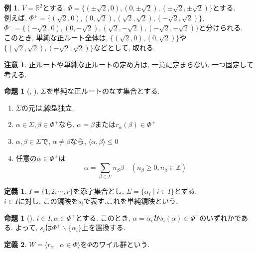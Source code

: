 \documentclass[
  a4paper, 
  12pt,
  ja=standard,
  xelatex,
  left=30truemm,
  right=30truemm,
  titlepage 
]{bxjsarticle}
\theoremstyle{definition}
\newtheorem{df}{定義}
\newtheorem{prop}[thm]{命題}
\newtheorem*{ex}{例}
\newtheorem*{re}{注意}
\begin{document}
\begin{ex}
  $ V = \mathbb{R}^2$とする. $ \Phi = \{ (\pm \sqrt{2}, 0), (0, \pm\sqrt{2}), (\pm\sqrt{2}, \pm\sqrt{2}) \}$とする. \\
  例えば, $\Phi^{+} = \{ ( \sqrt{2}, 0), (0, \sqrt{2}), (\sqrt{2}, \sqrt{2}), (-\sqrt{2}, \sqrt{2}) \}$, \\
  $\Phi^{-} = \{ ( -\sqrt{2}, 0), (0, -\sqrt{2}), (\sqrt{2}, -\sqrt{2}), (-\sqrt{2}, -\sqrt{2}) \}$と分けられる.  \\
  このとき, 単純な正ルート全体は,  $\{ ( \sqrt{2}, 0), (0, \sqrt{2}) \}$や$ \{ (\sqrt{2}, \sqrt{2}), (-\sqrt{2}, \sqrt{2}) \}$などとして,
  取れる.
\end{ex}

\begin{re}
  正ルートや単純な正ルートの定め方は, 一意に定まらない. 一つ固定して考える.
\end{re}

\begin{prop} [{\cite[命題2.1]{b1}}, {\cite[命題20.1]{b2}}] 
  $\Sigma$を単純な正ルートのなす集合とする.
  \begin{enumerate} 
    \item $\Sigma$の元は,線型独立.
    \item $\alpha \in \Sigma, \beta \in \Phi^{+}$なら, $\alpha = \beta$または$r_{\alpha}(\beta) \in \Phi^{+}$
    \item $\alpha, \beta \in \Sigma $で, $\alpha \neq \beta $なら, $ \langle \alpha, \beta \rangle \leq 0 $
    \item 任意の$\alpha \in \Phi^{+}$は
    $$ \alpha = \sum_{ \beta \in \Sigma} n_{\beta} \beta \quad (n_{\beta} \geq 0, n_{\beta} \in \mathbb{Z}) $$
  \end{enumerate}
\end{prop}

\begin{df}
  $I = \{ 1, 2, \cdots, r \}$を添字集合とし, $\Sigma = \{ \alpha_i \mid i \in I \}$とする. \\
  $ i \in I $に対し, この鏡映を$s_i$で表す.これを単純鏡映という.
\end{df}

\begin{prop} [{\cite[命題2.2]{b1}}]
  $ i \in I, \alpha \in \Phi^{+}$とする. このとき,
  $\alpha = \alpha_i$か$s_i(\alpha) \in \Phi^{+}$のいずれかである. 
  よって, $s_i$は$\Phi^{+} \backslash \{ \alpha_i\} $上を置換する.
\end{prop}

\begin{df}
  $W = \langle r_\alpha \mid \alpha \in \Phi \rangle $を$\Phi$のワイル群という.
\end{df}
\end{document}
